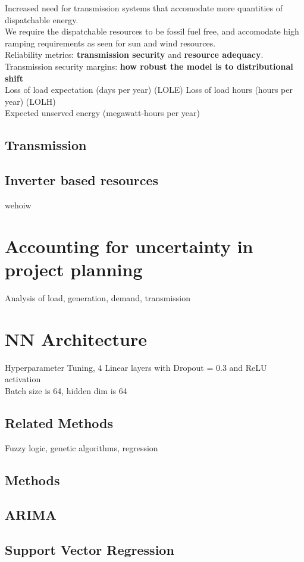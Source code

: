 \documentclass[plain]{article}
\newcommand{\1}{\mathbbm{1}}
\begin{document}
Increased need for transmission systems that accomodate more quantities of dispatchable energy.\\
We require the dispatchable resources to be fossil fuel free, and accomodate high ramping requirements as seen for sun and wind resources.\\
Reliability metrics: \textbf{transmission security} and \textbf{resource adequacy}.\\
Transmission security margins: \textbf{how robust the model is to distributional shift} \\
Loss of load expectation (days per year) (LOLE)
Loss of load hours (hours per year) (LOLH)\\
Expected unserved energy (megawatt-hours per year)\\

\subsection{Transmission}

\subsection{Inverter based resources}
wehoiw
\section{Accounting for uncertainty in project planning}

Analysis of load, generation, demand, transmission

\section{NN Architecture}
Hyperparameter Tuning, 4 Linear layers with Dropout = 0.3 and ReLU activation \\
Batch size is 64, hidden dim is 64
\subsection{Related Methods}
Fuzzy logic, genetic algorithms, regression
\subsection{Methods}
\subsection{ARIMA}
\subsection{Support Vector Regression}
\end{document}
